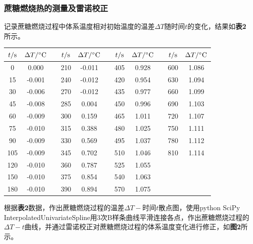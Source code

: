 \documentclass[12pt]{article}
\begin{document}
\subsubsection{蔗糖燃烧热的测量及雷诺校正}
记录蔗糖燃烧过程中体系温度相对初始温度的温差$\Delta T$随时间$t$的变化，结果如\textbf{表2}所示。
\begin{table}[h]
	\centering
	\begin{tabular}{ccccccccccc}
		\toprule
		$t/{\rm s}$ & $\Delta T/{\rm ^{\circ}C}$ & & $t/{\rm s}$ & $\Delta T/{\rm ^{\circ}C}$& & 	$t/{\rm s}$ & $\Delta T/{\rm ^{\circ}C}$ & & $t/{\rm s}$ & $\Delta T/{\rm ^{\circ}C}$ \\
		\midrule
		0   & 0.000  &  & 210 & -0.011 &  & 405 & 0.928 &  & 600 & 1.086 \\
		15  & -0.001 &  & 240 & -0.012 &  & 420 & 0.954 &  & 630 & 1.094 \\
		30  & -0.006 &  & 270 & -0.012 &  & 435 & 0.977 &  & 660 & 1.099 \\
		45  & -0.008 &  & 285 & 0.004  &  & 450 & 0.996 &  & 690 & 1.103 \\
		60  & -0.009 &  & 300 & 0.159  &  & 465 & 1.011 &  & 720 & 1.107 \\
		75  & -0.010 &  & 315 & 0.388  &  & 480 & 1.025 &  & 750 & 1.111 \\
		90  & -0.009 &  & 330 & 0.569  &  & 495 & 1.037 &  & 780 & 1.112 \\
		105 & -0.009 &  & 345 & 0.702  &  & 510 & 1.046 &  & 810 & 1.114 \\
		120 & -0.010 &  & 360 & 0.787  &  & 525 & 1.055 &  &     &       \\
		150 & -0.010 &  & 375 & 0.854  &  & 540 & 1.063 &  &     &       \\
		180 & -0.010 &  & 390 & 0.894  &  & 570 & 1.075 &  &     &        \\
		\bottomrule
	\end{tabular}
\end{table}
\par

根据\textbf{表2}数据，作出蔗糖燃烧过程的温差$\Delta T-$时间$t$散点图，使用python SciPy InterpolatedUnivariateSpline用3次B样条曲线平滑连接各点，作出蔗糖燃烧过程的$\Delta T-t$曲线，并通过雷诺校正对蔗糖燃烧过程的体系温度变化进行修正，如\textbf{图2}所示。
\end{document}
